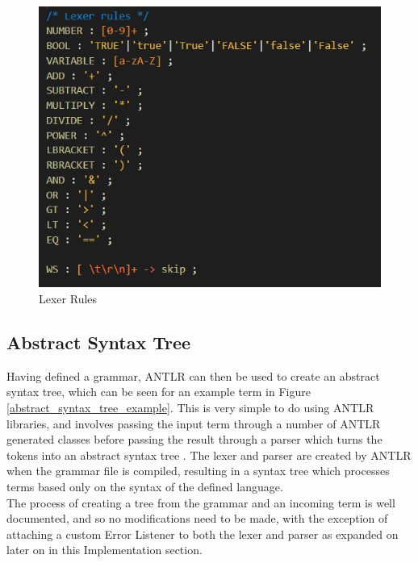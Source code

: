 \documentclass[a4paper,11pt]{report}
\begin{document}
\begin{figure}[p]
\centering
\includegraphics[scale=0.75]{images/lexer_rules}
\caption{Lexer Rules}
\label{lexer_rules}
\end{figure}

\subsection{Abstract Syntax Tree}

Having defined a grammar, ANTLR can then be used to create an abstract syntax tree, which can be seen for an example term in Figure \ref{abstract_syntax_tree_example}. This is very simple to do using ANTLR libraries, and involves passing the input term through a number of ANTLR generated classes before passing the result through a parser which turns the tokens into an abstract syntax tree \cite{Tomassetti2007}. The lexer and parser are created by ANTLR when the grammar file is compiled, resulting in a syntax tree which processes terms based only on the syntax of the defined language.\\

The process of creating a tree from the grammar and an incoming term is well documented, and so no modifications need to be made, with the exception of attaching a custom Error Listener to both the lexer and parser as expanded on later on in this Implementation section.
\end{document}
